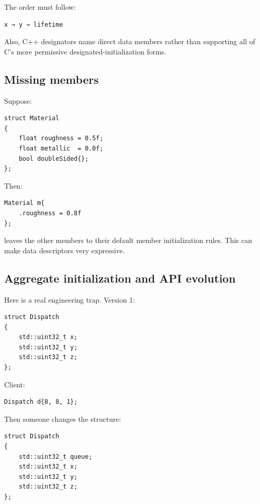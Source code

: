 The order must follow:

\begin{verbatim}
x → y → lifetime
\end{verbatim}

Also, C++ designators name direct data members rather than supporting all of C's more permissive designated-initialization forms.

\subsection{Missing members}\label{01-foundations-i-ch003-missing-members}

\hypertarget{01-foundations-i-ch003-missing-members}{}

Suppose:

\begin{verbatim}
struct Material
{
    float roughness = 0.5f;
    float metallic  = 0.0f;
    bool doubleSided{};
};
\end{verbatim}

Then:

\begin{verbatim}
Material m{
    .roughness = 0.8f
};
\end{verbatim}

leaves the other members to their default member initialization rules. This can make data descriptors very expressive.

\subsection{Aggregate initialization and API evolution}\label{01-foundations-i-ch003-aggregate-initialization-and-api-evolution}

\hypertarget{01-foundations-i-ch003-aggregate-initialization-and-api-evolution}{}

Here is a real engineering trap. Version 1:

\begin{verbatim}
struct Dispatch
{
    std::uint32_t x;
    std::uint32_t y;
    std::uint32_t z;
};
\end{verbatim}

Client:

\begin{verbatim}
Dispatch d{8, 8, 1};
\end{verbatim}

Then someone changes the structure:

\begin{verbatim}
struct Dispatch
{
    std::uint32_t queue;
    std::uint32_t x;
    std::uint32_t y;
    std::uint32_t z;
};
\end{verbatim}

